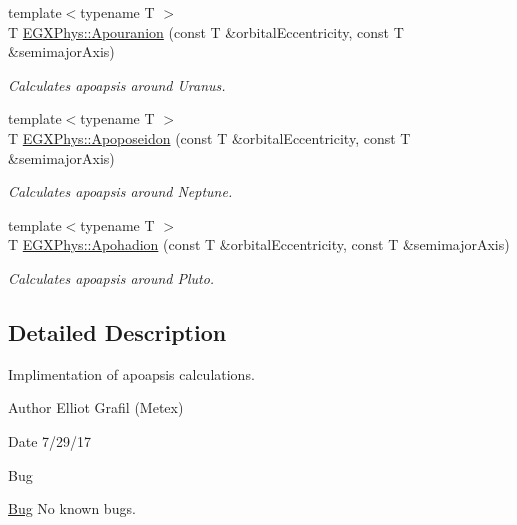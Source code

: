 \begin{DoxyCompactItemize}
{\footnotesize template$<$typename T $>$ }\\T \hyperlink{group___astrophysics_ga6efaf5c9379f1085fa6e51bf97356124}{E\+G\+X\+Phys\+::\+Apouranion} (const T \&orbital\+Eccentricity, const T \&semimajor\+Axis)
\begin{DoxyCompactList}\small\item\em Calculates apoapsis around Uranus. \end{DoxyCompactList}\item 
{\footnotesize template$<$typename T $>$ }\\T \hyperlink{group___astrophysics_ga89679654fff13176e989536163a27f9d}{E\+G\+X\+Phys\+::\+Apoposeidon} (const T \&orbital\+Eccentricity, const T \&semimajor\+Axis)
\begin{DoxyCompactList}\small\item\em Calculates apoapsis around Neptune. \end{DoxyCompactList}\item 
{\footnotesize template$<$typename T $>$ }\\T \hyperlink{group___astrophysics_gaa16847ddc5763c327067075dcb6a3353}{E\+G\+X\+Phys\+::\+Apohadion} (const T \&orbital\+Eccentricity, const T \&semimajor\+Axis)
\begin{DoxyCompactList}\small\item\em Calculates apoapsis around Pluto. \end{DoxyCompactList}\end{DoxyCompactItemize}


\subsection{Detailed Description}
Implimentation of apoapsis calculations. 

\begin{DoxyAuthor}{Author}
Elliot Grafil (Metex) 
\end{DoxyAuthor}
\begin{DoxyDate}{Date}
7/29/17 
\end{DoxyDate}
\begin{DoxyRefDesc}{Bug}
\item[\hyperlink{bug__bug000004}{Bug}]No known bugs. \end{DoxyRefDesc}

